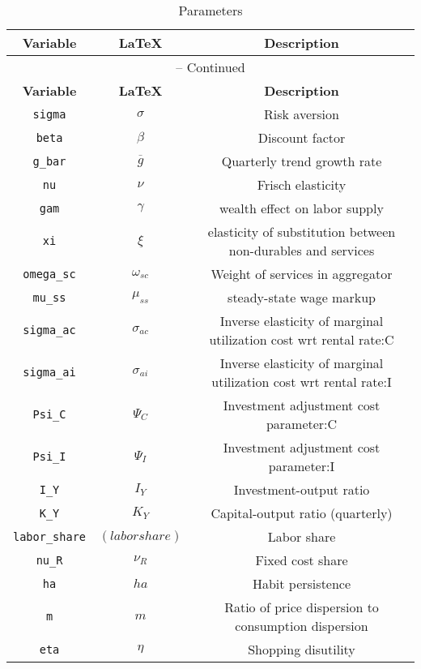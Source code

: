 \begin{center}
\begin{longtable}{ccc}
\caption{Parameters}\\%
\hline%
\multicolumn{1}{c}{\textbf{Variable}} &
\multicolumn{1}{c}{\textbf{\LaTeX}} &
\multicolumn{1}{c}{\textbf{Description}}\\%
\hline\hline%
\endfirsthead
\multicolumn{3}{c}{{\tablename} \thetable{} -- Continued}\\%
\hline%
\multicolumn{1}{c}{\textbf{Variable}} &
\multicolumn{1}{c}{\textbf{\LaTeX}} &
\multicolumn{1}{c}{\textbf{Description}}\\%
\hline\hline%
\endhead
\texttt{sigma} & ${\sigma}$ & Risk aversion\\
\texttt{beta} & ${\beta}$ & Discount factor\\
\texttt{g\_bar} & ${\overline{g}}$ & Quarterly trend growth rate\\
\texttt{nu} & $\nu$ & Frisch elasticity\\
\texttt{gam} & $\gamma$ & wealth effect on labor supply\\
\texttt{xi} & $\xi$ & elasticity of substitution between non-durables and services\\
\texttt{omega\_sc} & $\omega_{sc}$ & Weight of services in aggregator\\
\texttt{mu\_ss} & $\mu_{ss}$ & steady-state wage markup\\
\texttt{sigma\_ac} & ${\sigma_{ac}}$ & Inverse elasticity of marginal utilization cost wrt rental rate:C\\
\texttt{sigma\_ai} & ${\sigma_{ai}}$ & Inverse elasticity of marginal utilization cost wrt rental rate:I\\
\texttt{Psi\_C} & ${\Psi_C}$ & Investment adjustment cost parameter:C\\
\texttt{Psi\_I} & ${\Psi_I}$ & Investment adjustment cost parameter:I\\
\texttt{I\_Y} & ${I_Y}$ & Investment-output ratio\\
\texttt{K\_Y} & ${K_Y}$ & Capital-output ratio (quarterly)\\
\texttt{labor\_share} & $(labor share)$ & Labor share\\
\texttt{nu\_R} & ${\nu_R}$ & Fixed cost share\\
\texttt{ha} & ${ha}$ & Habit persistence\\
\texttt{m} & ${m}$ & Ratio of price dispersion to consumption dispersion\\
\texttt{eta} & ${\eta}$ & Shopping disutility\\

\end{longtable}
\end{center}
